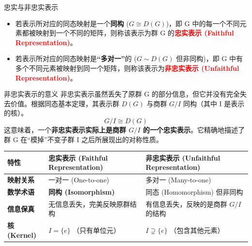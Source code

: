 \begin{definition}{忠实与非忠实表示}
    \begin{itemize}
        \item 若表示所对应的同态映射是一个\textbf{同构} ($G \cong D(G)$)，即 G 中的每一个不同元素都被映射到一个不同的矩阵，则称该表示为群 G 的\textbf{\textcolor{red}{忠实表示 (Faithful Representation)}}。
        
        \item 若表示所对应的同态映射是\textbf{“多对一”}的 ($G \sim D(G)$ 但非同构)，即 G 中有多个不同元素被映射到同一个矩阵，则称该表示为\textbf{\textcolor{red}{非忠实表示 (Unfaithful Representation)}}。
    \end{itemize}
\end{definition}

\begin{remark}{非忠实表示的意义}
    非忠实表示虽然丢失了原群 G 的部分信息，但它并没有完全失去价值。根据同态基本定理，其表示群 $D(G)$ 与商群 $G/I$ 同构（其中 I 是表示的核）。
    $$
        G/I \cong D(G)
    $$
    这意味着，一个\textbf{非忠实表示实际上是商群 $G/I$ 的一个忠实表示}。它精确地描述了群 G 在“模掉”不变子群 I 之后所展现出的对称性质。
\end{remark}

\begin{center}
    \begin{tabular}{l|l|l}
        \toprule
        \textbf{特性} & \textbf{忠实表示 (Faithful Representation)} & \textbf{非忠实表示 (Unfaithful Representation)} \\
        \midrule
        \textbf{映射关系} & 一对一 (One-to-one) & 多对一 (Many-to-one) \\
        \textbf{数学术语} & \textbf{同构 (Isomorphism)} & 同态 (Homomorphism) 但非同构 \\
        \textbf{信息保真} & 无信息丢失，完美反映原群结构 & 有信息丢失，反映的是商群 $G/I$ 的结构 \\
        \textbf{核 (Kernel)} & $I = \{e\}$ （只有单位元） & $I \supsetneq \{e\}$ （包含其他元素） \\
        \bottomrule
    \end{tabular}
\end{center}

